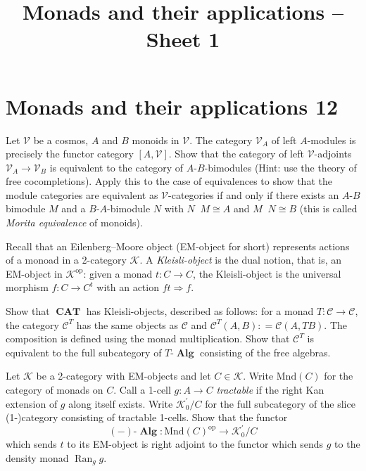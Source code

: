 \documentclass[12pt, a4paper]{article}
\date{}
\title{Monads and their applications -- Sheet 1}
\DeclareMathOperator{\op}{op}
\DeclareMathOperator{\Ran}{Ran}
\DeclareMathOperator{\Alg}{\mathbf{Alg}}
\DeclareMathOperator{\CAT}{\mathbf{CAT}}
\newcommand{\ca}[1]{\mathscr{#1}}
\newcommand{\ten}[1]{\mathop{{\otimes}_{#1}}}
\newcommand{\defl}{\mathrel{\mathop:}=}
\theoremstyle{plain}
\theoremstyle{definition}
\theoremstyle{citing}
\theoremstyle{citingdfn}
\numberwithin{equation}{section}
\begin{document}

\pagestyle{empty}
\section*{Monads and their applications 12}

\begin{question} 
 Let $\ca{V}$ be a cosmos, $A$ and $B$ monoids in $\ca{V}$. The category $\ca{V}_A$ of left $A$-modules is precisely the functor category $[A,\ca{V}]$. Show that the category of left $\ca{V}$-adjoints $\ca{V}_A \rightarrow \ca{V}_B$ is equivalent to the category of $A$-$B$-bimodules (Hint: use the theory of free cocompletions). Apply this to the case of equivalences to show that the module categories are equivalent as $\ca{V}$-categories if and only if there exists an $A$-$B$ bimodule $M$ and a $B$-$A$-bimodule $N$ with $N\ten{B}M \cong A$ and $M \ten{A} N \cong B$ (this is called \emph{Morita equivalence} of monoids).
 \end{question}

\begin{question}
 Recall that an Eilenberg--Moore object (EM-object for short) represents actions of a monoad in a 2-category $\ca{K}$. A \emph{Kleisli-object} is the dual notion, that is, an EM-object in $\ca{K}^{\op}$: given a monad $t \colon C \rightarrow C$, the Kleisli-object is the universal morphism $f \colon C \rightarrow C^t$ with an action $ft \Rightarrow f$.
 
 Show that $\CAT$ has Kleisli-objects, described as follows: for a monad $T \colon \ca{C} \rightarrow \ca{C}$, the category $\ca{C}^{T}$ has the same objects as $\ca{C}$ and $\ca{C}^{T}(A,B)\defl \ca{C}(A,TB)$. The composition is defined using the monad multiplication. Show that $\ca{C}^{T}$ is equivalent to the full subcategory of $T\mbox{-}\Alg$ consisting of the free algebras. 
\end{question}

\begin{question}
 Let $\ca{K}$ be a 2-category with EM-objects and let $C \in \ca{K}$. Write $\mathrm{Mnd}(C)$ for the category of monads on $C$. Call a 1-cell $g \colon A \rightarrow C$ \emph{tractable} if the right Kan extension of $g$ along itself exists. Write $\ca{K}_0^{\prime} \slash C$ for the full subcategory of the slice (1-)category consisting of tractable 1-cells. Show that the functor
 \[
(-)\mbox{-}\Alg \colon \mathrm{Mnd}(C)^{\op} \rightarrow \ca{K}_0^{\prime} \slash C
 \]
which sends $t$ to its EM-object is right adjoint to the functor which sends $g$ to the density monad $\Ran_g g$.
\end{question}
\end{document}
